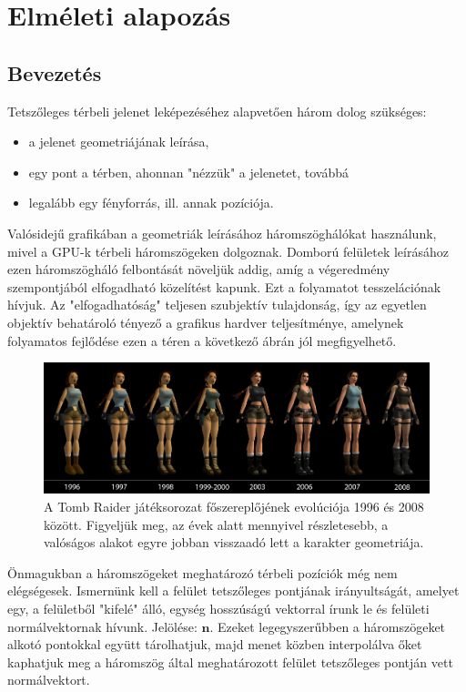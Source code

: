 
\section{Elméleti alapozás}

\subsection{Bevezetés}

Tetszőleges térbeli jelenet leképezéséhez alapvetően három dolog szükséges:

\begin{itemize}[noitemsep]
\item a jelenet geometriájának leírása,
\item egy pont a térben, ahonnan "nézzük" a jelenetet, továbbá
\item legalább egy fényforrás, ill. annak pozíciója.
\end{itemize}

Valósidejű grafikában a geometriák leírásához háromszöghálókat használunk, mivel a GPU-k térbeli háromszögeken dolgoznak. Domború felületek leírásához ezen háromszögháló felbontását növeljük addig, amíg a végeredmény szempontjából elfogadható közelítést kapunk. Ezt a folyamatot tesszelációnak hívjuk. Az "elfogadhatóság" teljesen szubjektív tulajdonság, így az egyetlen objektív behatároló tényező a grafikus hardver teljesítménye, amelynek folyamatos fejlődése ezen a téren a következő ábrán jól megfigyelhető.

\begin{figure}[!ht]
    \label{fig:tomb_raider_evolution}
    \centering
    \includegraphics[width=1.0\textwidth]{images/tomb_raider_evolution.png}
    \caption{A Tomb Raider játéksorozat főszereplőjének evolúciója 1996 és 2008 között. Figyeljük meg, az évek alatt mennyivel részletesebb, a valóságos alakot egyre jobban visszaadó lett a karakter geometriája. }
\end{figure}

Önmagukban a háromszögeket meghatározó térbeli pozíciók még nem elégségesek. Ismernünk kell a felület tetszőleges pontjának irányultságát, amelyet egy, a felületből "kifelé" álló, egység hosszúságú vektorral írunk le és felületi normálvektornak hívunk. Jelölése: \(\mathbf{n}\). Ezeket legegyszerűbben a háromszögeket alkotó pontokkal együtt tárolhatjuk, majd menet közben interpolálva őket kaphatjuk meg a háromszög által meghatározott felület tetszőleges pontján vett normálvektort.

